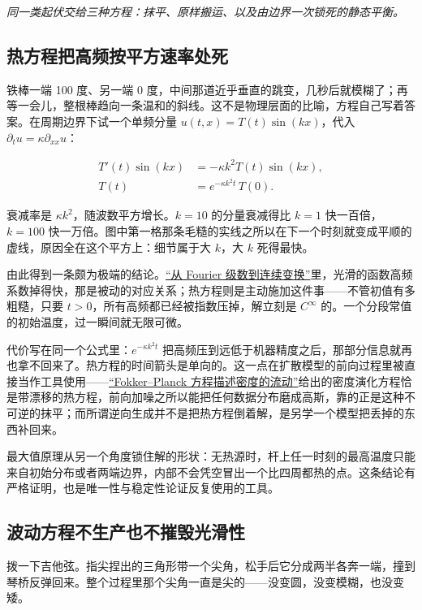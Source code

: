\emph{同一类起伏交给三种方程：抹平、原样搬运、以及由边界一次锁死的静态平衡。}

\subsection{热方程把高频按平方速率处死}

铁棒一端 100 度、另一端 0 度，中间那道近乎垂直的跳变，几秒后就模糊了；再等一会儿，整根棒趋向一条温和的斜线。这不是物理层面的比喻，方程自己写着答案。在周期边界下试一个单频分量 \(u(t,x)=T(t)\sin(kx)\)，代入 \(\partial_tu=\kappa\partial_{xx}u\)：

\[
\begin{aligned}
T'(t)\sin(kx)&=-\kappa k^2T(t)\sin(kx),\\
T(t)&=e^{-\kappa k^2t}\,T(0).
\end{aligned}
\]

衰减率是 \(\kappa k^2\)，随波数平方增长。\(k=10\) 的分量衰减得比 \(k=1\) 快一百倍，\(k=100\) 快一万倍。图中第一格那条毛糙的实线之所以在下一个时刻就变成平顺的虚线，原因全在这个平方上：细节属于大 \(k\)，大 \(k\) 死得最快。

由此得到一条颇为极端的结论。\hyperref[sec:08-Numerical-Analysis/08-Fourier-and-Spectral-Methods/01]{``从 Fourier 级数到连续变换''}里，光滑的函数高频系数掉得快，那是被动的对应关系；热方程则是主动施加这件事——不管初值有多粗糙，只要 \(t>0\)，所有高频都已经被指数压掉，解立刻是 \(C^\infty\) 的。一个分段常值的初始温度，过一瞬间就无限可微。

代价写在同一个公式里：\(e^{-\kappa k^2t}\) 把高频压到远低于机器精度之后，那部分信息就再也拿不回来了。热方程的时间箭头是单向的。这一点在扩散模型的前向过程里被直接当作工具使用——\hyperref[sec:06-Random-Processes/06-Diffusion-and-SDE/02]{``Fokker--Planck 方程描述密度的流动''}给出的密度演化方程恰是带漂移的热方程，前向加噪之所以能把任何数据分布磨成高斯，靠的正是这种不可逆的抹平；而所谓逆向生成并不是把热方程倒着解，是另学一个模型把丢掉的东西补回来。

最大值原理从另一个角度锁住解的形状：无热源时，杆上任一时刻的最高温度只能来自初始分布或者两端边界，内部不会凭空冒出一个比四周都热的点。这条结论有严格证明，也是唯一性与稳定性论证反复使用的工具。

\subsection{波动方程不生产也不摧毁光滑性}

拨一下吉他弦。指尖捏出的三角形带一个尖角，松手后它分成两半各奔一端，撞到琴桥反弹回来。整个过程里那个尖角一直是尖的——没变圆，没变模糊，也没变矮。

